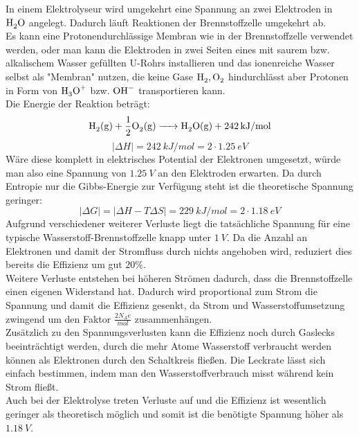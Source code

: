 \documentclass[a4paper,12pt,bibtotocnumbered]{scrartcl}
\numberwithin{equation}{section} %
\begin{document}
In einem Elektrolyseur wird umgekehrt eine Spannung an zwei Elektroden in $\ce{H_2O}$ angelegt. Dadurch läuft Reaktionen der Brennstoffzelle umgekehrt ab. \\
Es kann eine Protonendurchlässige Membran wie in der Brennstoffzelle verwendet werden, oder man kann die Elektroden in zwei Seiten eines mit saurem bzw. alkalischem Wasser gefüllten U-Rohrs installieren und das ionenreiche Wasser selbst als "Membran" nutzen, die keine Gase $\ce{H_2},\ce{O_2}$ hindurchlässt aber Protonen in Form von $\ce{H_3O^+}$ bzw. $\ce{OH^-}$ transportieren kann.\\
\newpage
Die Energie der Reaktion beträgt:
\begin{equation}
\ce{H_2(g) + \frac{1}{2}O_2(g) -> H_2O(g) + \SI{242}{kJ\per mol}}
\end{equation}\begin{equation}
|\Delta H| = \SI{242}{kJ\per mol} = 2\cdot\SI{1,25}{eV}
\end{equation}
Wäre diese komplett in elektrisches Potential der Elektronen umgesetzt, würde man also eine Spannung von $\SI{1,25}{V}$ an den Elektroden erwarten. Da durch Entropie nur die Gibbs-Energie zur Verfügung steht ist die theoretische Spannung geringer: 
\begin{equation}
|\Delta G| = |\Delta H - T \Delta S| = \SI{229}{kJ\per mol} = 2\cdot\SI{1,18}{eV}
\end{equation}
Aufgrund verschiedener weiterer Verluste liegt die tatsächliche Spannung für eine typische Wasserstoff-Brennstoffzelle knapp unter $\SI{1}{V}$. Da die Anzahl an Elektronen und damit der Stromfluss durch nichts angehoben wird, reduziert dies bereits die Effizienz um gut $20\%$.\\
Weitere Verluste entstehen bei höheren Strömen dadurch, dass die Brennstoffzelle einen eigenen Widerstand hat. Dadurch wird proportional zum Strom die Spannung und damit die Effizienz gesenkt, da Strom und Wasserstoffumsetzung zwingend um den Faktor $\frac{2N_A e}{\si{mol}}$ zusammenhängen.\\
Zusätzlich zu den Spannungsverlusten kann die Effizienz noch durch Gaslecks beeinträchtigt werden, durch die mehr Atome Wasserstoff verbraucht werden können als Elektronen durch den Schaltkreis fließen. Die Leckrate lässt sich einfach bestimmen, indem man den Wasserstoffverbrauch misst während kein Strom fließt.\\
Auch bei der Elektrolyse treten Verluste auf und die Effizienz ist wesentlich geringer als theoretisch möglich und somit ist die benötigte Spannung höher als $\SI{1,18}{V}$.\\
\end{document}
